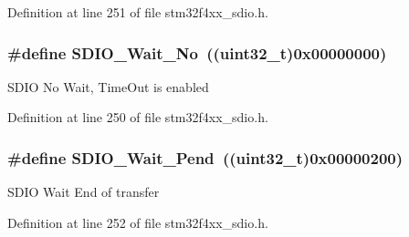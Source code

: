 Definition at line 251 of file stm32f4xx\-\_\-sdio.\-h.

\hypertarget{group___s_d_i_o___wait___interrupt___state_ga266294e1ffd7a4b45e62bff753ca44b2}{
\subsubsection[{S\-D\-I\-O\-\_\-\-Wait\-\_\-\-No}]{\setlength{\rightskip}{0pt plus 5cm}\#define S\-D\-I\-O\-\_\-\-Wait\-\_\-\-No~((uint32\-\_\-t)0x00000000)}}\label{group___s_d_i_o___wait___interrupt___state_ga266294e1ffd7a4b45e62bff753ca44b2}
S\-D\-I\-O No Wait, Time\-Out is enabled 

Definition at line 250 of file stm32f4xx\-\_\-sdio.\-h.

\hypertarget{group___s_d_i_o___wait___interrupt___state_ga2a4104023a7f8403ddd159ec3bbb8592}{
\subsubsection[{S\-D\-I\-O\-\_\-\-Wait\-\_\-\-Pend}]{\setlength{\rightskip}{0pt plus 5cm}\#define S\-D\-I\-O\-\_\-\-Wait\-\_\-\-Pend~((uint32\-\_\-t)0x00000200)}}\label{group___s_d_i_o___wait___interrupt___state_ga2a4104023a7f8403ddd159ec3bbb8592}
S\-D\-I\-O Wait End of transfer 

Definition at line 252 of file stm32f4xx\-\_\-sdio.\-h.

